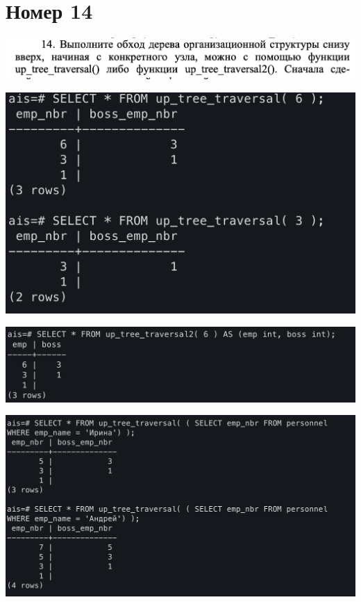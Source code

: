 \documentclass[a4paper,12pt]{article}
\begin{document}
\section*{Номер 14}
\begin{flushleft}
\includegraphics[scale=0.6]{14_1.png}
\end{flushleft}
\begin{flushleft}
\includegraphics[scale=0.5]{14_2.png}
\end{flushleft}
\begin{flushleft}
\includegraphics[scale=0.5]{14_3.png}
\end{flushleft}
\begin{flushleft}
\includegraphics[scale=0.5]{14_4.png}
\end{flushleft}
\clearpage
\end{document}

